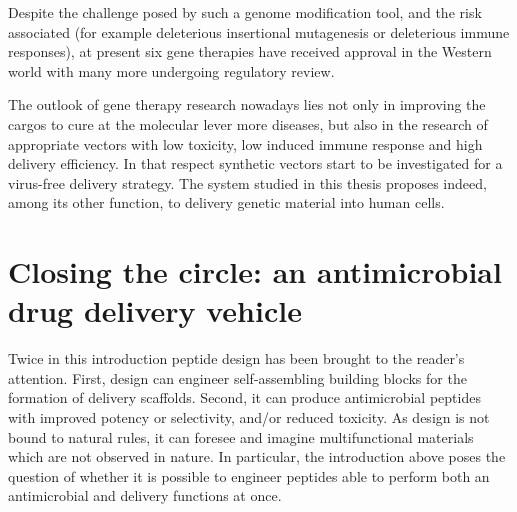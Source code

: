 Despite the challenge posed by such a genome modification tool, and the risk associated (for example deleterious insertional mutagenesis or deleterious immune responses), at present six gene therapies have received approval in the Western world \cite{Anguela2019} with many more undergoing regulatory review. 

The outlook of gene therapy research nowadays lies not only in improving the cargos to cure at the molecular lever more diseases, but also in the research of appropriate vectors with low toxicity, low induced immune response and high delivery efficiency. In that respect synthetic vectors start to be investigated for a virus-free delivery strategy. The system studied in this thesis proposes indeed, among its other function, to delivery genetic material into human cells.


\section{Closing the circle: an antimicrobial drug delivery vehicle}


Twice in this introduction peptide design has been brought to the reader's attention. First, design can engineer self-assembling building blocks for the formation of delivery scaffolds. Second, it can produce antimicrobial peptides with improved potency or selectivity, and/or reduced toxicity. As design is not bound to natural rules, it can foresee and imagine multifunctional materials which are not observed in nature. In particular, the introduction above poses the question of whether it is possible to engineer peptides able to perform both an antimicrobial and delivery functions at once.

